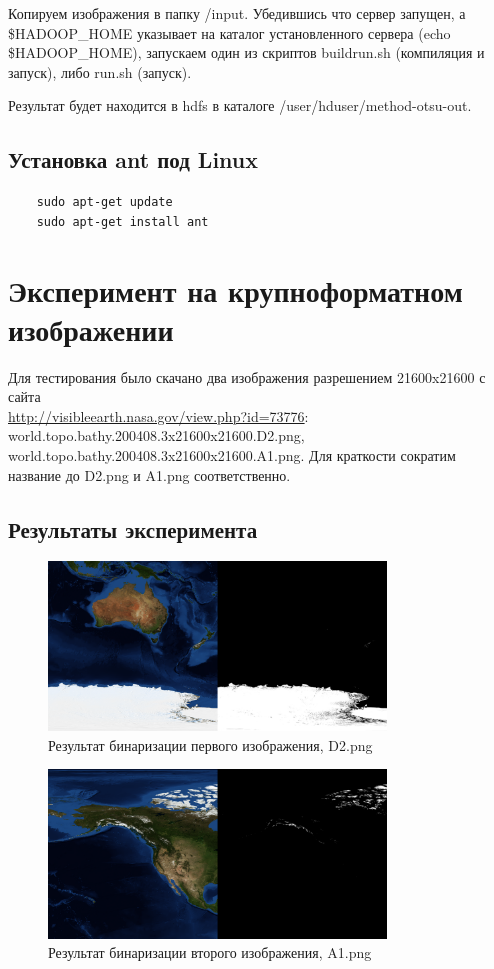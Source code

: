 \documentclass[12pt,a4paper]{extarticle} %
\begin{document}
    Копируем изображения в папку /input. Убедившись что сервер запущен, а \$HADOOP\_HOME указывает на каталог установленного сервера (echo \$HADOOP\_HOME), запускаем один из скриптов buildrun.sh (компиляция и запуск), либо run.sh (запуск).

    Результат будет находится в hdfs в каталоге /user/hduser/method-otsu-out.

\subsection{Установка ant под Linux}
\begin{lstlisting}
    sudo apt-get update 
    sudo apt-get install ant
\end{lstlisting}

\newpage
\section{Эксперимент на крупноформатном изображении}


	Для тестирования было скачано два изображения разрешением 21600x21600 с сайта\\ \href{http://visibleearth.nasa.gov/view.php?id=73776}{http://visibleearth.nasa.gov/view.php?id=73776}: world.topo.bathy.200408.3x21600x21600.D2.png, world.topo.bathy.200408.3x21600x21600.A1.png. Для краткости сократим название до D2.png и A1.png соответственно.

\subsection{Результаты эксперимента}

\begin{figure}[h]
    \centering
    \includegraphics[width=0.8\textwidth]{images/austr.png}
	\caption{Результат бинаризации первого изображения, D2.png}
\end{figure}

\begin{figure}[h]
    \centering
    \includegraphics[width=0.8\textwidth]{images/alaska.png}
	\caption{Результат бинаризации второго изображения, A1.png}
\end{figure}
\end{document}

